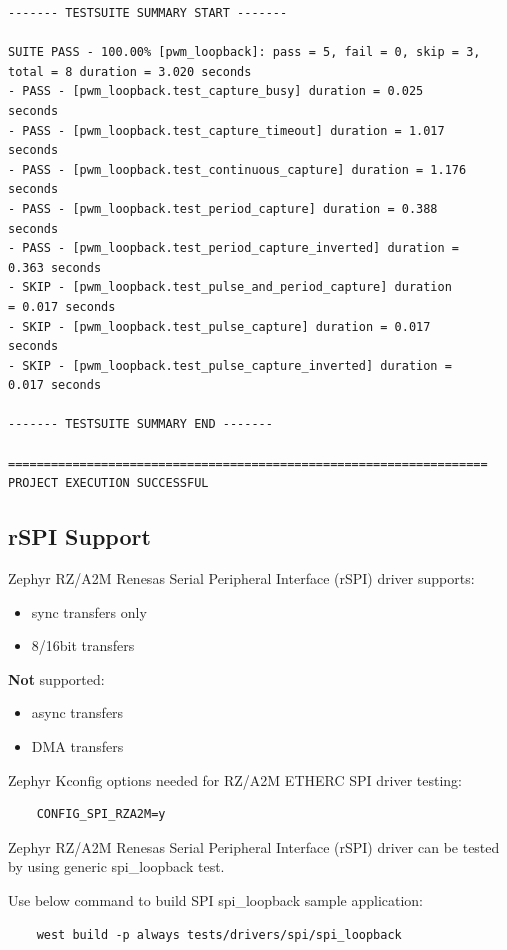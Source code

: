 \documentclass[11pt,a4paper,oneside]{article}
\begin{document}
\begin{lstlisting}
------- TESTSUITE SUMMARY START -------

SUITE PASS - 100.00% [pwm_loopback]: pass = 5, fail = 0, skip = 3,
total = 8 duration = 3.020 seconds
- PASS - [pwm_loopback.test_capture_busy] duration = 0.025
seconds
- PASS - [pwm_loopback.test_capture_timeout] duration = 1.017
seconds
- PASS - [pwm_loopback.test_continuous_capture] duration = 1.176
seconds
- PASS - [pwm_loopback.test_period_capture] duration = 0.388
seconds
- PASS - [pwm_loopback.test_period_capture_inverted] duration =
0.363 seconds
- SKIP - [pwm_loopback.test_pulse_and_period_capture] duration
= 0.017 seconds
- SKIP - [pwm_loopback.test_pulse_capture] duration = 0.017
seconds
- SKIP - [pwm_loopback.test_pulse_capture_inverted] duration =
0.017 seconds

------- TESTSUITE SUMMARY END -------

===================================================================
PROJECT EXECUTION SUCCESSFUL
\end{lstlisting}

\subsection{rSPI Support}\label{rspi-support}

Zephyr RZ/A2M Renesas Serial Peripheral Interface (rSPI) driver supports:
\begin{itemize}
	\item sync transfers only
	\item 8/16bit transfers
\end{itemize}

\textbf{Not} supported:
\begin{itemize}
	\item  async transfers
	\item  DMA transfers
\end{itemize}

Zephyr Kconfig options needed for RZ/A2M ETHERC SPI driver testing:

\begin{lstlisting}
	CONFIG_SPI_RZA2M=y
\end{lstlisting}

Zephyr RZ/A2M Renesas Serial Peripheral Interface (rSPI) driver can be tested by using generic spi\_loopback test.

Use below command to build SPI spi\_loopback sample application:

\begin{lstlisting}
	west build -p always tests/drivers/spi/spi_loopback
\end{lstlisting}
\end{document}
